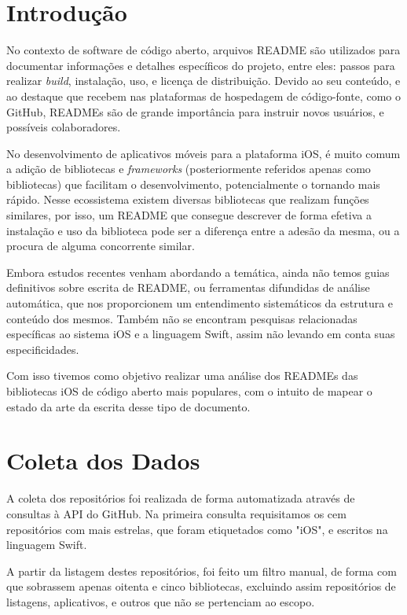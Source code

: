 \documentclass[preprint,12pt,authoryear]{elsarticle}
\begin{document}
\section{Introdução}
\label{}
No contexto de software de código aberto, arquivos README são utilizados para documentar informações e detalhes específicos do projeto, entre eles: passos para realizar \textit{build}, instalação, uso, e licença de distribuição. Devido ao seu conteúdo, e ao destaque que recebem nas plataformas de hospedagem de código-fonte, como o GitHub, READMEs são de grande importância para instruir novos usuários, e possíveis colaboradores.

No desenvolvimento de aplicativos móveis para a plataforma iOS, é muito comum a adição de bibliotecas e \textit{frameworks} (posteriormente referidos apenas como bibliotecas) que facilitam o desenvolvimento, potencialmente o tornando mais rápido. Nesse ecossistema existem diversas bibliotecas que realizam funções similares, por isso, um README que consegue descrever de forma efetiva  a instalação e uso da biblioteca pode ser a diferença entre a adesão da mesma, ou a procura de alguma concorrente similar.

Embora estudos recentes venham abordando a temática, ainda não temos guias definitivos sobre escrita de README, ou ferramentas difundidas de análise automática, que nos proporcionem um entendimento sistemáticos da estrutura e conteúdo dos mesmos. Também não se encontram pesquisas relacionadas específicas ao sistema iOS e a linguagem Swift, assim não levando em conta suas especificidades.

Com isso tivemos como objetivo realizar uma análise dos READMEs das bibliotecas iOS de código aberto mais populares, com o intuito de mapear o estado da arte da escrita desse tipo de documento.


\section{Coleta dos Dados}
A coleta dos repositórios foi realizada de forma automatizada através de consultas à API do GitHub. Na primeira consulta requisitamos os cem repositórios com mais estrelas, que foram etiquetados como "iOS", e escritos na linguagem Swift. 

A partir da listagem destes repositórios, foi feito um filtro manual, de forma com que sobrassem apenas oitenta e cinco bibliotecas, excluindo assim repositórios de listagens, aplicativos, e outros que não se pertenciam ao escopo.
\end{document}
